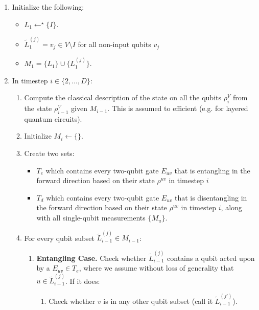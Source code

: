 \begin{enumerate}
\item
Initialize the following:
\begin{itemize}
\item
$L_1 \leftarrow^{\star} \{ I \}$.
\item
$\tilde{L}^{(j)}_1 = v_j \in V \setminus I$ for all non-input qubits $v_j$
\item
$M_1 = \{ L_1 \} \cup \{ L^{(j)}_1 \}$.
\end{itemize}

\item
In timestep $i \in \{2, \ldots, D \}$:

\begin{enumerate}

\item
Compute the classical description of the state on all the qubits $\rho^{V}_i$ from the state $\rho^{V}_{i-1}$
given $M_{i-1}$.
This is assumed to efficient (e.g. for layered quantum circuits). 
\item
Initialize $M_i \leftarrow \{\}$.
\item
Create two sets:
\begin{itemize}
\item $T_e$ which contains every two-qubit
gate $E_{uv}$ that is entangling in the forward direction based on
their state $\rho^{uv}$ in timestep $i$
\item $T_d$ which contains every two-qubit
gate $E_{uv}$ that is disentangling in the forward direction
 based on
their state $\rho^{uv}$ in timestep $i$,
along with all single-qubit measurements $\{ M_u \}$.
\end{itemize}

\item
For every qubit subset $\tilde{L}^{(j)}_{i-1} \in M_{i-1}$:

\begin{enumerate}
\item \textbf{Entangling Case.} Check whether $\tilde{L}^{(j)}_{i-1}$ contains a qubit acted upon by a
$E_{uv} \in T_e$, where we assume without loss of generality that
$u \in \tilde{L}^{(j)}_{i-1}$. If it does:

\begin{enumerate}
\item Check whether $v$ is in any other qubit subset
(call it $\tilde{L}^{(j')}_{i-1}$).


\end{enumerate}
\end{enumerate}
\end{enumerate}
\end{enumerate}
